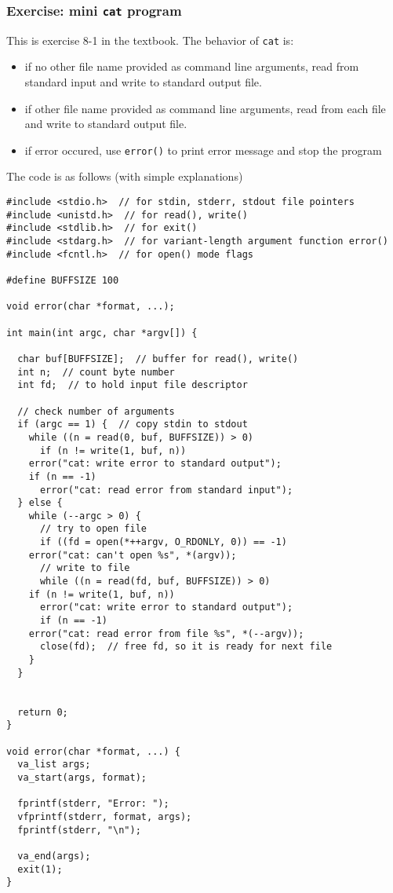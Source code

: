 \documentclass[12pt]{article}
\begin{document}
\subsubsection{Exercise: mini \texttt{cat} program}
\label{sec:orgb22ed24}
This is exercise 8-1 in the textbook. The behavior of \texttt{cat} is:
\begin{itemize}
\item if no other file name provided as command line arguments, read from standard input and write to standard output file.
\item if other file name provided as command line arguments, read from each file and write to standard output file.
\item if error occured, use \texttt{error()} to print error message and stop the program
\end{itemize}

The code is as follows (with simple explanations)
\begin{verbatim}
#include <stdio.h>  // for stdin, stderr, stdout file pointers
#include <unistd.h>  // for read(), write()
#include <stdlib.h>  // for exit()
#include <stdarg.h>  // for variant-length argument function error()
#include <fcntl.h>  // for open() mode flags

#define BUFFSIZE 100

void error(char *format, ...);

int main(int argc, char *argv[]) {

  char buf[BUFFSIZE];  // buffer for read(), write()
  int n;  // count byte number
  int fd;  // to hold input file descriptor

  // check number of arguments
  if (argc == 1) {  // copy stdin to stdout
    while ((n = read(0, buf, BUFFSIZE)) > 0)
      if (n != write(1, buf, n))
	error("cat: write error to standard output");
    if (n == -1)
      error("cat: read error from standard input");
  } else {
    while (--argc > 0) {
      // try to open file
      if ((fd = open(*++argv, O_RDONLY, 0)) == -1)
	error("cat: can't open %s", *(argv));
      // write to file 
      while ((n = read(fd, buf, BUFFSIZE)) > 0)
	if (n != write(1, buf, n))
	  error("cat: write error to standard output");
      if (n == -1)
	error("cat: read error from file %s", *(--argv));
      close(fd);  // free fd, so it is ready for next file 
    }
  }


  return 0;
}

void error(char *format, ...) {
  va_list args;
  va_start(args, format);

  fprintf(stderr, "Error: ");
  vfprintf(stderr, format, args);
  fprintf(stderr, "\n");

  va_end(args);
  exit(1);
}
\end{verbatim}
\end{document}

